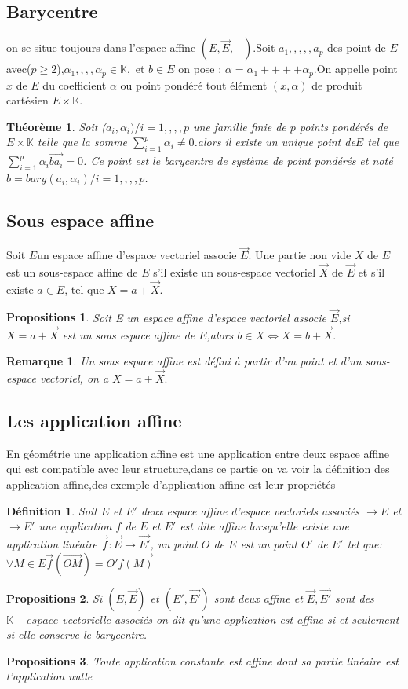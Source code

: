 \documentclass[12pt]{report}
\newtheorem{theo}{Théorème}[section]
\newtheorem{madef}{Définition}[section]
\newtheorem{rmq}{Remarque}[section]
\newtheorem{propos}{Propositions}[section]
\begin{document}
\subsection{Barycentre}
on se situe toujours dans l'espace affine $(E,\vec{E},+)$.Soit $a_{1},,,,,a_{p}$ des point de $E$ avec($p\geq2$),$\alpha_{1}     ,,,,\alpha_{p}\in \mathbb{K},$ et $b\in E$ on pose : $\alpha=\alpha_{1}+ + + +\alpha_{p}$.On appelle point $x$ de $E$ du coefficient $\alpha$ ou point pondéré tout élément $(x,\alpha)$ de produit cartésien $E\times\mathbb{K}$.
\begin{theo}   Soit {($a_{i},\alpha_{i})/i=1,,,,p$} une famille finie de $p$ points pondérés de  $E\times\mathbb{K}$ telle que la somme $\sum_{i=1}^p \alpha_{i}\neq 0$.alors il existe un unique point de$E$ tel que $\sum_{i=1}^p \alpha_{i}\vec{ba_{i}}=0$. Ce point est le barycentre de système de point pondérés et noté $b=bary{(a_{i},\alpha_{i}) /i=1,,,,p}$.  
\end{theo}
\subsection{Sous espace affine}
Soit $E$un espace affine d'espace vectoriel associe $\vec{E}$. Une partie non vide $X$ de $E$ est un sous-espace affine de $E$ s'il existe un sous-espace vectoriel $\vec{X}$ de $\vec{E}$ et s'il existe $a\in E$, tel que $X=a+\vec{X}$.
\begin{propos} 
Soit E un espace affine d'espace vectoriel associe $\vec{E}$,si $X=a+\vec{X}$ est un sous espace affine de $E$,alors $b\in X\Leftrightarrow X=b+\vec{X}$.
\end{propos}
\begin{rmq} Un sous espace affine est défini à partir d'un point et d'un sous-espace vectoriel, on a $X=a+\vec{X}.$ 
\end{rmq}    
\subsection{Les application affine} 
En géométrie une application affine est une application entre deux espace affine qui est compatible avec leur structure,dans ce partie on va voir la définition des application affine,des exemple d'application affine est leur propriétés 
\begin{madef}
Soit $E$ et $E'$ deux espace affine d'espace vectoriels associés $\longrightarrow E$ et $\longrightarrow E'$
une application $f$ de $E$ et $E'$ est dite affine lorsqu'elle existe une application linéaire $\vec{f}:\vec{E} \longrightarrow  \vec{E'}$, un point $O$ de $E$ est un point $O'$ de $E'$ tel que:
$\forall M \in E \vec{f}(\overrightarrow{OM})=\overrightarrow{O'f(M)}$
\end{madef}
\begin{propos}
Si $(E,\overrightarrow{E})$ et $(E',\overrightarrow{E'})$ sont deux affine et $\overrightarrow{E},\overrightarrow{E'}$ sont des $\mathbb{K}-espace$ vectorielle associés on dit qu'une application est affine si et seulement si elle conserve le barycentre.
\end{propos}
\begin{propos} Toute application constante est affine dont sa partie linéaire est l'application nulle %
\end{propos}
\end{document}
